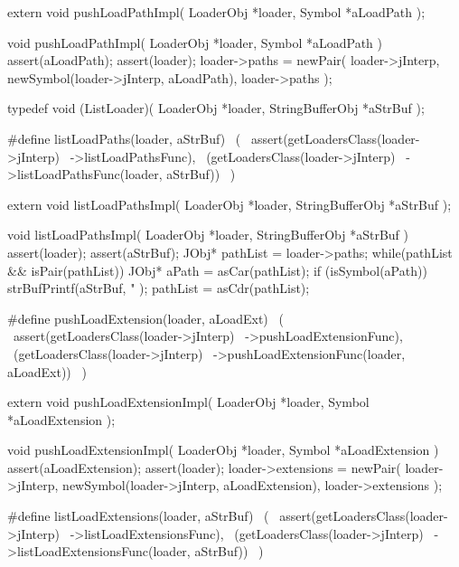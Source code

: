\startCHeader
extern void pushLoadPathImpl(
  LoaderObj *loader,
  Symbol    *aLoadPath
);
\stopCHeader
{}

\startCCode
void pushLoadPathImpl(
  LoaderObj *loader,
  Symbol    *aLoadPath
) {
  assert(aLoadPath);
  assert(loader);
  loader->paths =
    newPair(
      loader->jInterp,
      newSymbol(loader->jInterp, aLoadPath),
      loader->paths
    );
}
\stopCCode

\startCHeader
typedef void (ListLoader)(
  LoaderObj       *loader,
  StringBufferObj *aStrBuf
);

#define listLoadPaths(loader, aStrBuf)      \
  (                                         \
    assert(getLoadersClass(loader->jInterp) \
      ->listLoadPathsFunc),                 \
    (getLoadersClass(loader->jInterp)       \
      ->listLoadPathsFunc(loader, aStrBuf)) \
  )
\stopCHeader

\setCHeaderStream{private}
\startCHeader
extern void listLoadPathsImpl(
  LoaderObj       *loader,
  StringBufferObj *aStrBuf
);
\stopCHeader
{}

\startCCode
void listLoadPathsImpl(
  LoaderObj       *loader,
  StringBufferObj *aStrBuf
) {
  assert(loader);
  assert(aStrBuf);
  JObj* pathList = loader->paths;
  while(pathList && isPair(pathList)) {
    JObj* aPath = asCar(pathList);
    if (isSymbol(aPath)) {
      strBufPrintf(aStrBuf,
        "%
      );
    }
    pathList = asCdr(pathList);
  }  
}
\stopCCode

\startCHeader
#define pushLoadExtension(loader, aLoadExt)       \
  (                                               \
    assert(getLoadersClass(loader->jInterp)       \
      ->pushLoadExtensionFunc),                   \
    (getLoadersClass(loader->jInterp)             \
      ->pushLoadExtensionFunc(loader, aLoadExt))  \
  )
\stopCHeader

\startCHeader
extern void pushLoadExtensionImpl(
  LoaderObj *loader,
  Symbol    *aLoadExtension
);
\stopCHeader
\setCHeaderStream{public}

\startCCode
void pushLoadExtensionImpl(
  LoaderObj *loader,
  Symbol    *aLoadExtension
) {
  assert(aLoadExtension);
  assert(loader);
  loader->extensions =
    newPair(
      loader->jInterp, 
      newSymbol(loader->jInterp, aLoadExtension),
      loader->extensions
    );
}
\stopCCode

\startCHeader
#define listLoadExtensions(loader, aStrBuf)      \
  (                                              \
    assert(getLoadersClass(loader->jInterp)      \
      ->listLoadExtensionsFunc),                 \
    (getLoadersClass(loader->jInterp)            \
      ->listLoadExtensionsFunc(loader, aStrBuf)) \
  )
\stopCHeader

